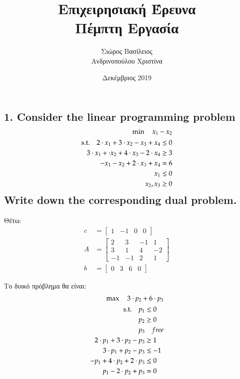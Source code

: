 \documentclass[12pt]{article}
\title{\hugeΑλγοριθμική Επιχειρησιακή Έρευνα\\Πέμπτη Εργασία}
\author{Σιώρος Βασίλειος\\Ανδρινοπούλου Χριστίνα}
\date{Δεκέμβριος 2019}
\begin{document}
\maketitle


\pagebreak


\subsection*{1. Consider the linear programming problem
	\begin{align*}
		\min \quad x_{1} - x_{2} \\
		\begin{aligned}
			\textup{s.t.}\quad
			2 \cdot x_{1} + 3 \cdot x_{2} - x_{3} + x_{4} & \leq 0 \\
			3 \cdot x_{1} + \cdot x_{2} + 4 \cdot x_{3} - 2 \cdot x_{4} & \geq 3 \\    
			- x_{1} - x_{2} + 2 \cdot x_{3} + x_{4} & = 6 \\
			x_{1} & \leq 0 \\
			x_{2}, x_{3} & \geq 0 
		\end{aligned}
	\end{align*}
	Write down the corresponding dual problem.}

Θέτω: \\ 

\begin{align*}
	c &= \begin{bmatrix}
			1 & -1 & 0 & 0
		\end{bmatrix} \\
	A &= \begin{bmatrix}
			2 & 3 & -1 & 1 \\
			3 & 1 & 4 & -2 \\
			-1 & -1 & 2 & 1
		\end{bmatrix} \\
	b &= \begin{bmatrix}
			0 & 3 & 6 & 0
		\end{bmatrix}
\end{align*}

Το δυικό πρόβλημα θα είναι: \\

\begin{align*}
	\max \quad 3 \cdot p_{2} + 6 \cdot p_{3} \\
	\begin{aligned}
		\textup{s.t.}\quad
		p_{1} & \leq 0 \\
		p_{2} & \geq 0 \\
		p_{3} & \quad free \\
		2 \cdot p_{1} + 3 \cdot p_{2} - p_{3} & \geq 1 \\
		3 \cdot p_{1} + p_{2} - p_{3} & \leq -1 \\
		-p_{1} + 4 \cdot p_{2} + 2 \cdot p_{3} & \leq 0 \\
		p_{1} - 2 \cdot p_{2} + p_{3} & = 0
	\end{aligned}
\end{align*}
\end{document}
